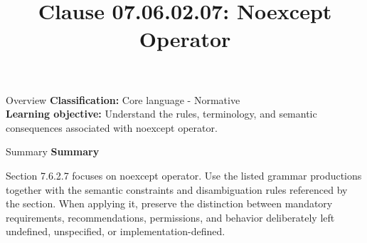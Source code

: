 \documentclass[10pt,letterpaper]{article}
\title{Clause 07.06.02.07: Noexcept Operator}
\author{}
\date{}
\begin{document}
\maketitle
\begin{CornellOverviewBox}{Overview}
\textbf{Classification:} Core language - Normative\\[2pt]
\textbf{Learning objective:} Understand the rules, terminology, and semantic consequences associated with noexcept operator.
\end{CornellOverviewBox}\begin{CornellSummaryBox}{Summary}
{\sffamily\bfseries\color{Accent} Summary}\par\vspace{3pt}Section 7.6.2.7 focuses on noexcept operator. Use the listed grammar productions together with the semantic constraints and disambiguation rules referenced by the section. When applying it, preserve the distinction between mandatory requirements, recommendations, permissions, and behavior deliberately left undefined, unspecified, or implementation-defined.
\end{CornellSummaryBox}
\end{document}
